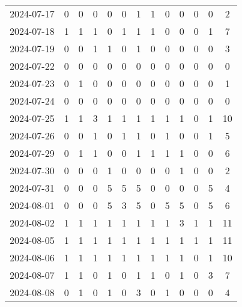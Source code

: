 \documentclass[dvipdfmx,oneside]{article}
\begin{document}
\begin{longtable}{lcccccccccccc}
        2024-07-17 &     0 &     0 &     0 &     0 &     0 &     1 &     1 &     0 &     0 &     0 &     0 &      2 \\
        2024-07-18 &     1 &     1 &     1 &     0 &     1 &     1 &     1 &     0 &     0 &     0 &     1 &      7 \\
        2024-07-19 &     0 &     0 &     1 &     1 &     0 &     1 &     0 &     0 &     0 &     0 &     0 &      3 \\
        2024-07-22 &     0 &     0 &     0 &     0 &     0 &     0 &     0 &     0 &     0 &     0 &     0 &      0 \\
        2024-07-23 &     0 &     1 &     0 &     0 &     0 &     0 &     0 &     0 &     0 &     0 &     0 &      1 \\
        2024-07-24 &     0 &     0 &     0 &     0 &     0 &     0 &     0 &     0 &     0 &     0 &     0 &      0 \\
        2024-07-25 &     1 &     1 &     3 &     1 &     1 &     1 &     1 &     1 &     1 &     0 &     1 &     10 \\
        2024-07-26 &     0 &     0 &     1 &     0 &     1 &     1 &     0 &     1 &     0 &     0 &     1 &      5 \\
        2024-07-29 &     0 &     1 &     1 &     0 &     0 &     1 &     1 &     1 &     1 &     0 &     0 &      6 \\
        2024-07-30 &     0 &     0 &     0 &     1 &     0 &     0 &     0 &     0 &     1 &     0 &     0 &      2 \\
        2024-07-31 &     0 &     0 &     0 &     5 &     5 &     5 &     0 &     0 &     0 &     0 &     5 &      4 \\
        2024-08-01 &     0 &     0 &     0 &     5 &     3 &     5 &     0 &     5 &     5 &     0 &     5 &      6 \\
        2024-08-02 &     1 &     1 &     1 &     1 &     1 &     1 &     1 &     1 &     3 &     1 &     1 &     11 \\
        2024-08-05 &     1 &     1 &     1 &     1 &     1 &     1 &     1 &     1 &     1 &     1 &     1 &     11 \\
        2024-08-06 &     1 &     1 &     1 &     1 &     1 &     1 &     1 &     1 &     1 &     0 &     1 &     10 \\
        2024-08-07 &     1 &     1 &     0 &     1 &     0 &     1 &     1 &     0 &     1 &     0 &     3 &      7 \\
        2024-08-08 &     0 &     1 &     0 &     1 &     0 &     3 &     0 &     1 &     0 &     0 &     0 &      4 \\

\end{longtable}
\end{document}
